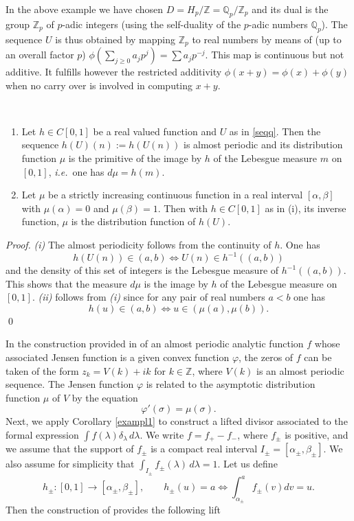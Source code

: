 \documentclass[graybox, envcountsect%
]{svmult}
\def\Q{{\mathbb Q}}
\def\Z{{\mathbb Z}}
\newcommand{\ie}{{\it i.e.\/}\ }
\begin{document}
\begin{rem}\label{symhypo}
 In the above example we have chosen $D=H_p/\Z=\Q_p/\Z_p$ and its dual is the group $\Z_p$ of $p$-adic integers (using the self-duality of the $p$-adic numbers $\Q_p$). The sequence $U$ is thus obtained by mapping $\Z_p$ to real numbers by means of (up to an overall factor $p$)  $\phi(\sum_{j\geq 0} a_jp^j)=\sum a_jp^{-j}$. This map is continuous but  not additive. It fulfills however the restricted additivity $\phi(x+y)=\phi(x)+\phi(y)$ when no carry over is involved in computing $x+y$.
		\end{rem}

\begin{corollary}\label{exampl1}\
\begin{enumerate}
\item[(i)] Let $h\in C[0,1]$ be a real valued function and $U$ as in \eqref{seqq}. Then the sequence $h(U)(n):=h(U(n))$ is almost periodic and its distribution function $\mu$ is the primitive of the image by $h$ of the Lebesgue measure $m$ on $[0,1]$, \ie one has $d\mu=h(m)$.
\item[(ii)] Let $\mu$ be a strictly increasing continuous function in a real interval $[\alpha,\beta]$ with $\mu(\alpha)=0$ and $\mu(\beta)=1$. Then with $h\in C[0,1]$ as in  (i), its inverse function, $\mu$ is the distribution function of $h(U)$. 
\end{enumerate}
\end{corollary}
\begin{proof} {\it (i)} The almost periodicity follows from the continuity of $h$. One has
$$
h(U(n))\in (a,b)\iff U(n)\in h^{-1}((a,b))
$$
and the density of this set of integers is the Lebesgue measure of $h^{-1}((a,b))$. This shows that  the measure $d\mu$ is the image by $h$ of the Lebesgue measure on $[0,1]$.\newline
{\it (ii)} follows from {\it (i)} since for any pair of real numbers $a<b$ one has
$$
h(u)\in (a,b)\iff u\in (\mu(a),\mu(b)).
$$\qed \end{proof}
In the construction provided in  \cite{JT} of an almost periodic analytic function $f$ whose associated Jensen function is a given convex function $\varphi$, the zeros of $f$ can be taken of the form $z_k=V(k)+ik$ for $k\in \Z$,  where $V(k)$ is an almost periodic sequence. The  Jensen function $\varphi$ is  related to the asymptotic distribution function $\mu$ of $V$ by the equation 
\begin{equation}\label{phiprime}
\varphi'(\sigma)=\mu(\sigma).
\end{equation}
Next, we apply Corollary \ref{exampl1} to construct a lifted divisor associated to the formal expression $\int f(\lambda) \delta_\lambda\, d\lambda$.  We write $f=f_+-f_-$, where $f_\pm$ is positive, and we assume that the support of $f_\pm$ is a compact real interval $I_\pm=[\alpha_\pm,\beta_\pm]$. We also assume for simplicity that $\int_{I_\pm} f_\pm(\lambda) \, d\lambda=1$.  Let us define 
\begin{equation}\label{lifted0}
h_\pm:[0,1]\to [\alpha_\pm,\beta_\pm], \qquad h_\pm(u)=a\iff \int_{\alpha_\pm}^a f_\pm (v)dv=u.
\end{equation}
Then the construction of \cite{JT} provides the following lift 
\end{document}

